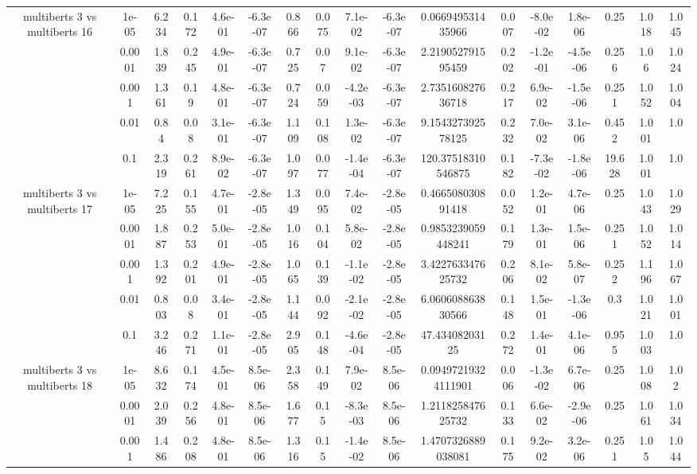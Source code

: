 \begin{tabular}{|c|c|c|c|c|c|c|c|c|c|c|c|c|c|c|c|c|}
\hline
\multirow{5}{*}{multiberts 3 vs multiberts 16} & 1e-05 & 6.234 & 0.172 & 4.6e-01 & -6.3e-07 & 0.866 & 0.075 & 7.1e-02 & -6.3e-07 & 0.066949531435966 & 0.007 & -8.0e-02 & 1.8e-06 & 0.25 & 1.018 & 1.045 \\
 & 0.0001 & 1.839 & 0.245 & 4.9e-01 & -6.3e-07 & 0.725 & 0.07 & 9.1e-02 & -6.3e-07 & 2.219052791595459 & 0.202 & -1.2e-01 & -4.5e-06 & 0.256 & 1.06 & 1.024 \\
 & 0.001 & 1.361 & 0.19 & 4.8e-01 & -6.3e-07 & 0.724 & 0.059 & -4.2e-03 & -6.3e-07 & 2.735160827636718 & 0.217 & 6.9e-02 & -1.5e-06 & 0.251 & 1.052 & 1.004 \\
 & 0.01 & 0.84 & 0.08 & 3.1e-01 & -6.3e-07 & 1.109 & 0.108 & 1.3e-02 & -6.3e-07 & 9.154327392578125 & 0.232 & 7.0e-02 & 3.1e-06 & 0.452 & 1.001 & 1.0 \\
 & 0.1 & 2.319 & 0.261 & 8.9e-02 & -6.3e-07 & 1.097 & 0.077 & -1.4e-04 & -6.3e-07 & 120.37518310546875 & 0.182 & -7.3e-02 & -1.8e-06 & 19.628 & 1.001 & 1.0 \\
\hline
\multirow{5}{*}{multiberts 3 vs multiberts 17} & 1e-05 & 7.225 & 0.155 & 4.7e-01 & -2.8e-05 & 1.349 & 0.095 & 7.4e-02 & -2.8e-05 & 0.466508030891418 & 0.052 & 1.2e-01 & 4.7e-06 & 0.25 & 1.043 & 1.029 \\
 & 0.0001 & 1.887 & 0.253 & 5.0e-01 & -2.8e-05 & 1.016 & 0.104 & 5.8e-02 & -2.8e-05 & 0.9853239059448241 & 0.179 & 1.3e-01 & 1.5e-06 & 0.251 & 1.052 & 1.014 \\
 & 0.001 & 1.392 & 0.201 & 4.9e-01 & -2.8e-05 & 1.065 & 0.139 & -1.1e-02 & -2.8e-05 & 3.422763347625732 & 0.206 & 8.1e-02 & 5.8e-07 & 0.252 & 1.196 & 1.067 \\
 & 0.01 & 0.803 & 0.08 & 3.4e-01 & -2.8e-05 & 1.144 & 0.092 & -2.1e-02 & -2.8e-05 & 6.060608863830566 & 0.148 & 1.5e-01 & -1.3e-06 & 0.3 & 1.021 & 1.001 \\
 & 0.1 & 3.246 & 0.271 & 1.1e-01 & -2.8e-05 & 2.905 & 0.148 & -4.6e-04 & -2.8e-05 & 47.43408203125 & 0.272 & 1.4e-01 & 4.1e-06 & 0.955 & 1.003 & 1.0 \\
\hline
\multirow{5}{*}{multiberts 3 vs multiberts 18} & 1e-05 & 8.632 & 0.174 & 4.5e-01 & 8.5e-06 & 2.358 & 0.149 & 7.9e-02 & 8.5e-06 & 0.09497219324111901 & 0.006 & -1.3e-02 & 6.7e-06 & 0.25 & 1.008 & 1.02 \\
 & 0.0001 & 2.039 & 0.256 & 4.8e-01 & 8.5e-06 & 1.677 & 0.15 & -8.3e-03 & 8.5e-06 & 1.211825847625732 & 0.133 & 6.6e-02 & -2.9e-06 & 0.25 & 1.061 & 1.034 \\
 & 0.001 & 1.486 & 0.208 & 4.8e-01 & 8.5e-06 & 1.316 & 0.15 & -1.4e-02 & 8.5e-06 & 1.4707326889038081 & 0.175 & 9.2e-02 & 3.2e-06 & 0.251 & 1.05 & 1.044 \\

\end{tabular}
